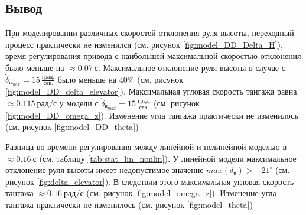\subsection{Вывод}
При моделировании различных скоростей отклонения руля высоты, переходный
процесс практически не изменился (см. рисунок \ref{fig:model_DD_Delta_H}), время
регулирования привода с наибольшей максимальной скоростью отклонения было
меньше на $\approx 0.07\ с$. Максимальное отклонение руля высоты в случае с
$\dot{\delta}_{{в}_{max}} = 15\, \frac{\text{град.}}{\text{сек.}}$ было меньше
на $40 \%$ (см. рисунок \ref{fig:model_DD_delta_elevator}). Максимальная
угловая скорость тангажа равна $\approx 0.115\ \text{рад/с}$ у модели с
$\dot{\delta}_{{в}_{max}} = 15\, \frac{\text{град.}}{\text{сек.}}$ (см. рисунок
\ref{fig:model_DD_omega_z}). Изменение угла тангажа практически не изменилось
(см. рисунок \ref{fig:model_DD_theta})

Разница во времени регулирования между линейной и нелинейной моделью в $\approx
0.16\ с$ (см. таблицу \ref{tab:stat_lin_nonlin}). У линейной модели
максимальное отклонение руля высоты имеет недопустимое значение $max(\delta_{в})
> -21^\circ$ (см. рисунок \ref{fig:delta_elevator}). В следствии этого
максимальная угловая скорость тангажа $\approx 0.16 \ \text{рад/с}$ (см. рисунок
\ref{fig:model_omega_z}). Изменение угла тангажа
практически не изменилось (см. рисунок \ref{fig:model_theta})

